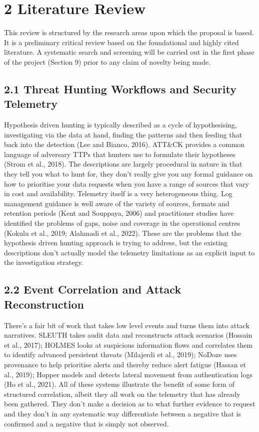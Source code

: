 \documentclass[a4paper,11pt]{article}
\begin{document}
\section{2 Literature Review}
This review is structured by the research areas upon which the proposal is based. It is a preliminary critical review based on the foundational and highly cited literature. A systematic search and screening will be carried out in the first phase of the project (Section 9) prior to any claim of novelty being made.\par
\subsection{2.1 Threat Hunting Workflows and Security Telemetry}
Hypothesis driven hunting is typically described as a cycle of hypothesising, investigating via the data at hand, finding the patterns and then feeding that back into the detection (Lee and Bianco, 2016). ATT\&CK provides a common language of adversary TTPs that hunters use to formulate their hypotheses (Strom et al., 2018). The descriptions are largely procedural in nature in that they tell you what to hunt for, they don't really give you any formal guidance on how to prioritise your data requests when you have a range of sources that vary in cost and availability. Telemetry itself is a very heterogeneous thing. Log management guidance is well aware of the variety of sources, formats and retention periods (Kent and Souppaya, 2006) and practitioner studies have identified the problems of gaps, noise and coverage in the operational centres (Kokulu et al., 2019; Alahmadi et al., 2022). These are the problems that the hypothesis driven hunting approach is trying to address, but the existing descriptions don't actually model the telemetry limitations as an explicit input to the investigation strategy.\par
\subsection{2.2 Event Correlation and Attack Reconstruction}
There's a fair bit of work that takes low level events and turns them into attack narratives. SLEUTH takes audit data and reconstructs attack scenarios (Hossain et al., 2017); HOLMES looks at suspicious information flows and correlates them to identify advanced persistent threats (Milajerdi et al., 2019); NoDoze uses provenance to help prioritise alerts and thereby reduce alert fatigue (Hassan et al., 2019); Hopper models and detects lateral movement from authentication logs (Ho et al., 2021). All of these systems illustrate the benefit of some form of structured correlation, albeit they all work on the telemetry that has already been gathered. They don't make a decision as to what further evidence to request and they don't in any systematic way differentiate between a negative that is confirmed and a negative that is simply not observed.\par
\end{document}
